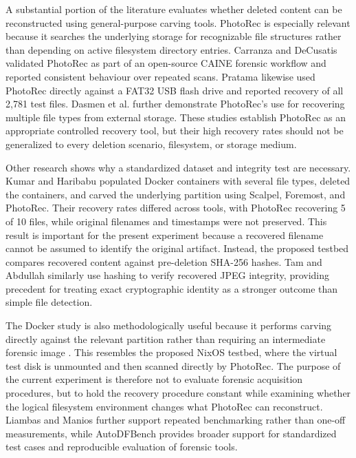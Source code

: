 \documentclass[conference]{IEEEtran}
\begin{document}
A substantial portion of the literature evaluates whether deleted content can be reconstructed using general-purpose carving tools. PhotoRec is especially relevant because it searches the underlying storage for recognizable file structures rather than depending on active filesystem directory entries. Carranza and DeCusatis \cite{carranza2021daubert} validated PhotoRec as part of an open-source CAINE forensic workflow and reported consistent behaviour over repeated scans. Pratama \cite{pratama2021photorec} likewise used PhotoRec directly against a FAT32 USB flash drive and reported recovery of all 2,781 test files. Dasmen et al. \cite{dasmen2024photorec} further demonstrate PhotoRec's use for recovering multiple file types from external storage. These studies establish PhotoRec as an appropriate controlled recovery tool, but their high recovery rates should not be generalized to every deletion scenario, filesystem, or storage medium.

Other research shows why a standardized dataset and integrity test are necessary. Kumar and Haribabu \cite{kumar2022docker} populated Docker containers with several file types, deleted the containers, and carved the underlying partition using Scalpel, Foremost, and PhotoRec. Their recovery rates differed across tools, with PhotoRec recovering 5 of 10 files, while original filenames and timestamps were not preserved. This result is important for the present experiment because a recovered filename cannot be assumed to identify the original artifact. Instead, the proposed testbed compares recovered content against pre-deletion SHA-256 hashes. Tam and Abdullah \cite{tam2024androidjpeg} similarly use hashing to verify recovered JPEG integrity, providing precedent for treating exact cryptographic identity as a stronger outcome than simple file detection.

The Docker study is also methodologically useful because it performs carving directly against the relevant partition rather than requiring an intermediate forensic image \cite{kumar2022docker}. This resembles the proposed NixOS testbed, where the virtual test disk is unmounted and then scanned directly by PhotoRec. The purpose of the current experiment is therefore not to evaluate forensic acquisition procedures, but to hold the recovery procedure constant while examining whether the logical filesystem environment changes what PhotoRec can reconstruct. Liambas and Manios \cite{liambas2024performance} further support repeated benchmarking rather than one-off measurements, while AutoDFBench \cite{wickramasekara2026autodfbench} provides broader support for standardized test cases and reproducible evaluation of forensic tools.
\end{document}
